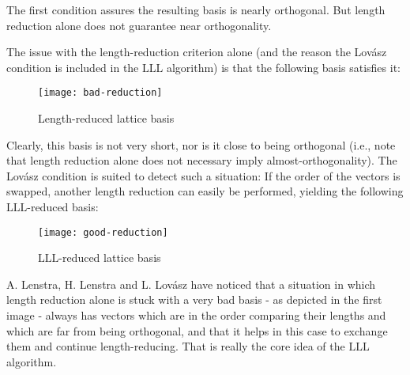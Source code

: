 \begin{plain}
\normalfont
The first condition assures the resulting basis is nearly orthogonal. But length reduction alone does not guarantee near orthogonality.
\end{plain}

The issue with the length-reduction criterion alone (and the reason the Lovász condition is included in the $\mathrm{LLL}$ algorithm) is that the following basis satisfies it:

\begin{figure}[H]
\centering
\texttt{[image: bad-reduction]}
\caption{Length-reduced lattice basis}
\end{figure}

Clearly, this basis is not very short, nor is it close to being orthogonal (i.e., note that length reduction alone does not necessary imply almost-orthogonality). The Lovász condition is suited to detect such a situation: If the order of the vectors is swapped, another length reduction can easily be performed, yielding the following $\mathrm{LLL}$-reduced basis:

\begin{figure}[H]
\centering
\texttt{[image: good-reduction]}
\caption{$\mathrm{LLL}$-reduced lattice basis}
\end{figure}

A. Lenstra, H. Lenstra and L. Lovász have noticed that a situation in which length reduction alone is stuck with a very bad basis - as depicted in the first image - always has vectors which are in the  order comparing their lengths and which are far from being orthogonal, and that it helps in this case to exchange them and continue length-reducing. That is really the core idea of the $\mathrm{LLL}$ algorithm.




